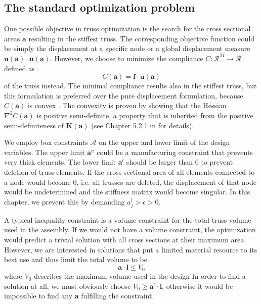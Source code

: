 \subsection{The standard optimization problem}
\label{sec:standard_truss_problem}
One possible objective in truss optimization is the search for the cross sectional areas $\mathbf{a}$ resulting in the stiffest truss. The corresponding objective function could be simply the displacement at a specific node or a global displacement measure $\mathbf{u} (\mathbf{a}) \cdot \mathbf{u} (\mathbf{a})$. However, we choose to minimize the compliance $C: \mathcal{R}^{M} \rightarrow \mathcal{R}$ defined as 
\begin{equation}
    C(\mathbf{a}) = \mathbf{f} \cdot \mathbf{u}(\mathbf{a})
\end{equation} 
of the truss instead. The minimal compliance results also in the stiffest truss, but this formulation is preferred over the pure displacement formulation, because $C(\mathbf{a})$ is convex \cite{Svanberg1984}. The convexity is proven by showing that the Hessian $\nabla^2 C(\mathbf{a})$ is positive semi-definite, a property that is inherited from the positive semi-definiteness of $\mathbf{K}(\mathbf{a})$ (see Chapter 5.2.1 in \cite{Christensen2008} for details).

We employ box constraints $\mathcal{A}$ on the upper and lower limit of the design variables. The upper limit $\mathbf{a}^u$ could be a manufacturing constraint that prevents very thick elements. The lower limit $\mathbf{a}^l$ should be larger than $0$ to prevent deletion of truss elements. If the cross sectional area of all elements connected to a node would become $0$, i.e. all trusses are deleted, the displacement of that node would be undetermined and the stiffness matrix would become singular. In this chapter, we prevent this by demanding $a_j^l > \epsilon > 0$.

A typical inequality constraint is a volume constraint for the total truss volume used in the assembly. If we would not have a volume constraint, the optimization would predict a trivial solution with all cross sections at their maximum area. However, we are interested in solutions that put a limited material resource to its best use and thus limit the total volume to be 
\begin{equation}
    \mathbf{a} \cdot \mathbf{l} \le V_0
\end{equation}
where $V_0$ describes the maximum volume used in the design
In order to find a solution at all, we must obviously choose $V_0 \ge \mathbf{a}^l \cdot \mathbf{l}$, otherwise it would be impossible to find any $\mathbf{a}$ fulfilling the constraint. 

